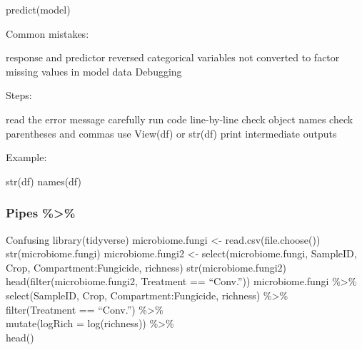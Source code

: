 \documentclass[
]{article}
\begin{document}
predict(model)

Common mistakes:

response and predictor reversed categorical variables not converted to
factor missing values in model data Debugging

Steps:

read the error message carefully run code line-by-line check object
names check parentheses and commas use View(df) or str(df) print
intermediate outputs

Example:

str(df) names(df)

\subsubsection{Pipes \%\textgreater\%}\label{pipes}

Confusing library(tidyverse) microbiome.fungi \textless-
read.csv(file.choose()) str(microbiome.fungi) microbiome.fungi2
\textless- select(microbiome.fungi, SampleID, Crop,
Compartment:Fungicide, richness) str(microbiome.fungi2)
head(filter(microbiome.fungi2, Treatment == ``Conv.'')) microbiome.fungi
\%\textgreater\% select(SampleID, Crop, Compartment:Fungicide, richness)
\%\textgreater\%\\
filter(Treatment == ``Conv.'') \%\textgreater\%\\
mutate(logRich = log(richness)) \%\textgreater\%\\
head()
\end{document}
